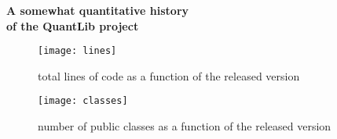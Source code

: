 \documentclass[12pt,a4paper]{article}
\begin{document}
\begin{center}
    \textbf{\Large A somewhat quantitative history \\ of the QuantLib project}
\end{center}

\begin{figure}[htbp]
    \centering
    \texttt{[image: lines]}
    \caption{total lines of code as a function of the released version}
\end{figure}

\begin{figure}[htbp]
    \centering
    \texttt{[image: classes]}
    \caption{number of public classes as a function of the released version}
\end{figure}
\end{document}
